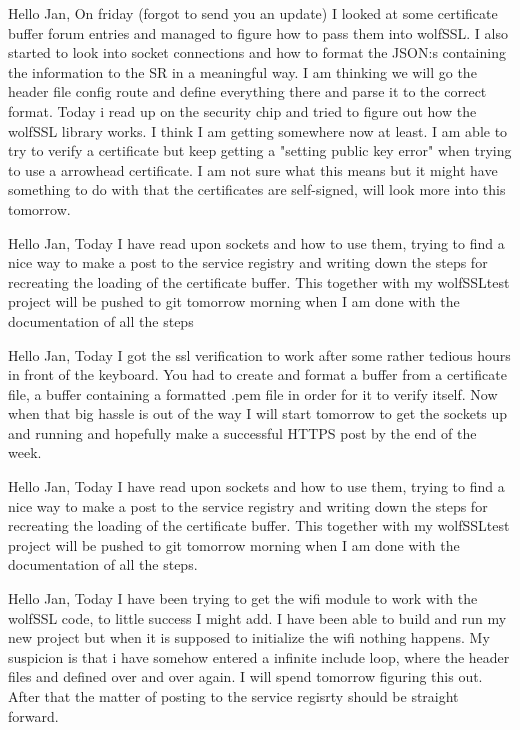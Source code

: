 Hello Jan,
On friday (forgot to send you an update) I looked at some certificate buffer forum entries and managed to figure how to pass them into wolfSSL. 
I also started to look into socket connections and how to format the JSON:s containing the information to the SR in a meaningful way. 
I am thinking we will go the header file config route and define everything there and parse it to the correct format.
Today i read up on the security chip and tried to figure out how the wolfSSL library works. I think I am getting somewhere now at least. 
I am able to try to verify a certificate but keep getting a "setting public key error" when trying to use a arrowhead certificate. 
I am not sure what this means but it might have something to do with that the certificates are self-signed, will look more into this tomorrow. 

Hello Jan,
Today I have read upon sockets and how to use them, trying to find a nice way to make a post to the service registry and writing down the steps for recreating 
the loading of the certificate buffer. This together with my wolfSSLtest project will be pushed to git tomorrow morning when I am done with the documentation 
of all the steps

Hello Jan,
Today I got the ssl verification to work after some rather tedious hours in front of the keyboard. You had to create and format a buffer 
from a certificate file, a buffer containing a formatted .pem file in order for it to verify itself. Now when that big hassle is out 
of the way I will start tomorrow to get the sockets up and running and hopefully make a successful  HTTPS post by the end of the week.

Hello Jan,
Today I have read upon sockets and how to use them, trying to find a nice way to make a post to the service registry and writing down the steps for 
recreating the loading of the certificate buffer. This together with my wolfSSLtest project will be pushed to git tomorrow morning when I am done 
with the documentation of all the steps. 

Hello Jan,
Today I have been trying to get the wifi module to work with the wolfSSL code, to little success I might add. I have been able to build and run my new project but 
when it is supposed to initialize the wifi nothing happens. My suspicion is that i have somehow entered a infinite include loop, where the header files and defined over 
and over again. I will spend tomorrow figuring this out. After that the matter of posting to the service regisrty should be straight forward.

